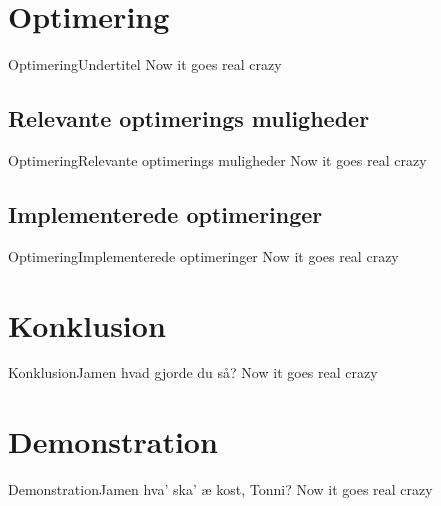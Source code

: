 
\section{Optimering}
\begin{frame}{Optimering}{Undertitel}
	Now it goes real crazy
\end{frame}

\subsection{Relevante optimerings muligheder}
\begin{frame}{Optimering}{Relevante optimerings muligheder}
	Now it goes real crazy
\end{frame}

\subsection{Implementerede optimeringer}
\begin{frame}{Optimering}{Implementerede optimeringer}
	Now it goes real crazy
\end{frame}

\section{Konklusion}
\begin{frame}{Konklusion}{Jamen hvad gjorde du så?}
	Now it goes real crazy
\end{frame}

\section{Demonstration}
\begin{frame}{Demonstration}{Jamen hva' ska' æ kost, Tonni?}
	Now it goes real crazy
\end{frame}

